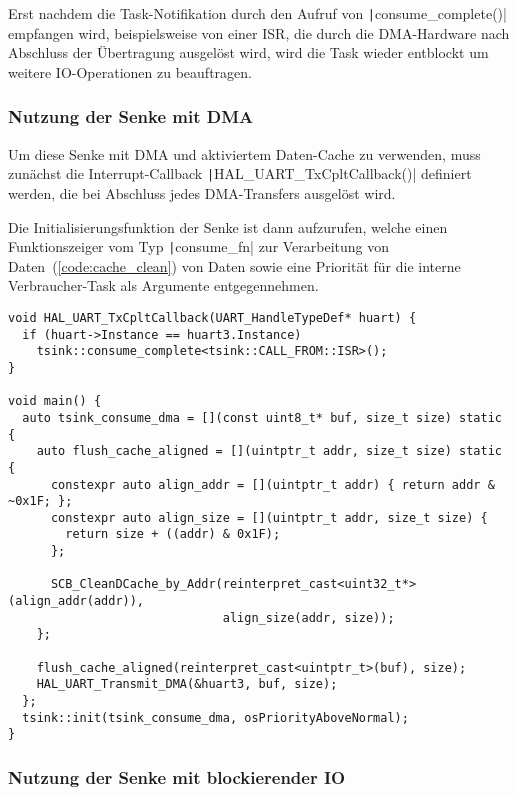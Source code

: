 Erst nachdem die Task-Notifikation durch den Aufruf von
\texttt|consume_complete()| empfangen wird, beispielsweise von einer
\ac{ISR}, die durch die DMA-Hardware nach Abschluss der Übertragung ausgelöst
wird, wird die Task wieder entblockt um weitere IO-Operationen zu beauftragen.

\subsubsection{Nutzung der Senke mit DMA}

Um diese Senke mit DMA und aktiviertem Daten-Cache zu verwenden, muss zunächst
die Interrupt-Callback \texttt|HAL_UART_TxCpltCallback()| definiert
werden, die bei Abschluss jedes DMA-Transfers ausgelöst wird.

Die Initialisierungsfunktion der Senke ist dann aufzurufen, welche einen
Funktionszeiger vom Typ \texttt|consume_fn| zur Verarbeitung von
Daten~(\ref{code:cache_clean}) von Daten sowie eine Priorität für die interne
Verbraucher-Task als Argumente entgegennehmen.

\begin{code}
\begin{verbatim}
void HAL_UART_TxCpltCallback(UART_HandleTypeDef* huart) {
  if (huart->Instance == huart3.Instance)
    tsink::consume_complete<tsink::CALL_FROM::ISR>();
}

void main() {
  auto tsink_consume_dma = [](const uint8_t* buf, size_t size) static {
    auto flush_cache_aligned = [](uintptr_t addr, size_t size) static {
      constexpr auto align_addr = [](uintptr_t addr) { return addr & ~0x1F; };
      constexpr auto align_size = [](uintptr_t addr, size_t size) {
        return size + ((addr) & 0x1F);
      };

      SCB_CleanDCache_by_Addr(reinterpret_cast<uint32_t*>(align_addr(addr)),
                              align_size(addr, size));
    };

    flush_cache_aligned(reinterpret_cast<uintptr_t>(buf), size);
    HAL_UART_Transmit_DMA(&huart3, buf, size);
  };
  tsink::init(tsink_consume_dma, osPriorityAboveNormal);
}
\end{verbatim}
\end{code}

\subsubsection{Nutzung der Senke mit blockierender IO}

